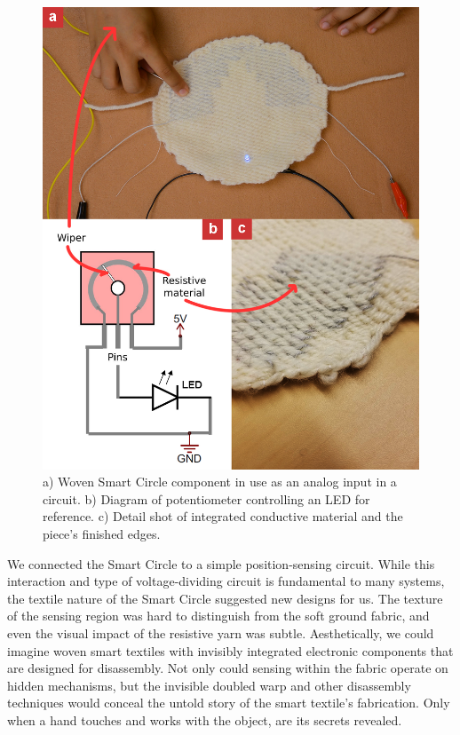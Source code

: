\begin{figure}
    \centering
    \includegraphics[width=0.9\linewidth]{figs/UF_sensor.png}
    \caption[Prototype of a smart textile potentiometer component.]{a) Woven Smart Circle component in use as an analog input in a circuit. b) Diagram of potentiometer controlling an LED for reference. c) Detail shot of integrated conductive material and the piece's finished edges.}
    \label{fig:smartCircle}
\end{figure}

We connected the Smart Circle to a simple position-sensing circuit. While this interaction and type of voltage-dividing circuit is fundamental to many systems, the textile nature of the Smart Circle suggested new designs for us. The texture of the sensing region was hard to distinguish from the soft ground fabric, and even the visual impact of the resistive yarn was subtle. Aesthetically, we could imagine woven smart textiles with invisibly integrated electronic components that are designed for disassembly. Not only could sensing within the fabric operate on hidden mechanisms, but the invisible doubled warp and other disassembly techniques would conceal the untold story of the smart textile's fabrication. Only when a hand touches and works with the object, are its secrets revealed.

